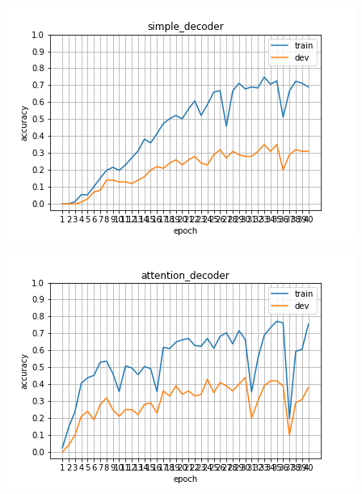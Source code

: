\documentclass{article}
\begin{document}
\includegraphics[scale=0.5]{simple_decoder.png}

\includegraphics[scale=0.5]{attention_decoder.png}
\end{document}
